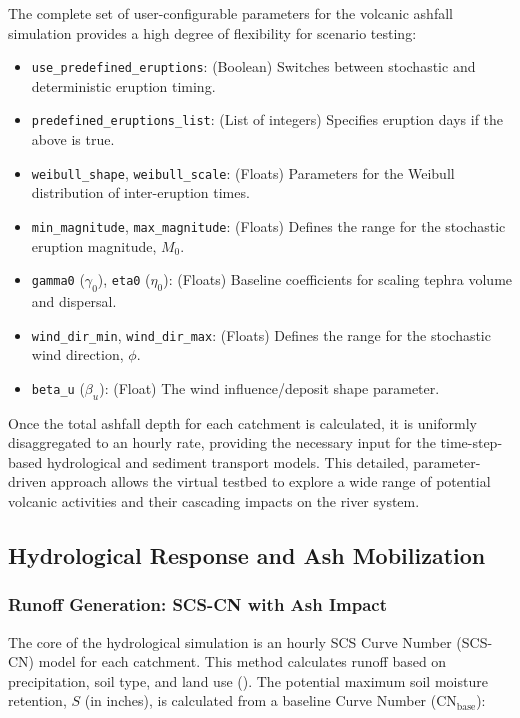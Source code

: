 \documentclass[12pt, a4paper]{article}
\begin{document}
The complete set of user-configurable parameters for the volcanic ashfall simulation provides a high degree of flexibility for scenario testing:
\begin{itemize}
    \item \texttt{use\_predefined\_eruptions}: (Boolean) Switches between stochastic and deterministic eruption timing.
    \item \texttt{predefined\_eruptions\_list}: (List of integers) Specifies eruption days if the above is true.
    \item \texttt{weibull\_shape}, \texttt{weibull\_scale}: (Floats) Parameters for the Weibull distribution of inter-eruption times.
    \item \texttt{min\_magnitude}, \texttt{max\_magnitude}: (Floats) Defines the range for the stochastic eruption magnitude, \(M_0\).
    \item \texttt{gamma0} (\(\gamma_0\)), \texttt{eta0} (\(\eta_0\)): (Floats) Baseline coefficients for scaling tephra volume and dispersal.
    \item \texttt{wind\_dir\_min}, \texttt{wind\_dir\_max}: (Floats) Defines the range for the stochastic wind direction, \(\phi\).
    \item \texttt{beta\_u} (\(\beta_u\)): (Float) The wind influence/deposit shape parameter.
\end{itemize}

Once the total ashfall depth for each catchment is calculated, it is uniformly disaggregated to an hourly rate, providing the necessary input for the time-step-based hydrological and sediment transport models. This detailed, parameter-driven approach allows the virtual testbed to explore a wide range of potential volcanic activities and their cascading impacts on the river system.

\subsection{Hydrological Response and Ash Mobilization}

\subsubsection{Runoff Generation: SCS-CN with Ash Impact}
The core of the hydrological simulation is an hourly SCS Curve Number (SCS-CN) model for each catchment. This method calculates runoff based on precipitation, soil type, and land use (\citealp{USDA1986}). The potential maximum soil moisture retention, $S$ (in inches), is calculated from a baseline Curve Number ($\text{CN}_{\text{base}}$):
\end{document}
